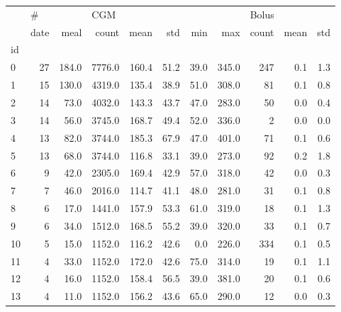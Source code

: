 \begin{tabular}{lrrrrrrrrrr}
\toprule
{} & \multicolumn{2}{l}{\#} & \multicolumn{5}{l}{CGM} & \multicolumn{3}{l}{Bolus} \\
{} & date &   meal &   count &   mean &   std &   min &    max & count & mean &  std \\
id &      &        &         &        &       &       &        &       &      &      \\
\midrule
0  &   27 &  184.0 &  7776.0 &  160.4 &  51.2 &  39.0 &  345.0 &   247 &  0.1 &  1.3 \\
1  &   15 &  130.0 &  4319.0 &  135.4 &  38.9 &  51.0 &  308.0 &    81 &  0.1 &  0.8 \\
2  &   14 &   73.0 &  4032.0 &  143.3 &  43.7 &  47.0 &  283.0 &    50 &  0.0 &  0.4 \\
3  &   14 &   56.0 &  3745.0 &  168.7 &  49.4 &  52.0 &  336.0 &     2 &  0.0 &  0.0 \\
4  &   13 &   82.0 &  3744.0 &  185.3 &  67.9 &  47.0 &  401.0 &    71 &  0.1 &  0.6 \\
5  &   13 &   68.0 &  3744.0 &  116.8 &  33.1 &  39.0 &  273.0 &    92 &  0.2 &  1.8 \\
6  &    9 &   42.0 &  2305.0 &  169.4 &  42.9 &  57.0 &  318.0 &    42 &  0.0 &  0.3 \\
7  &    7 &   46.0 &  2016.0 &  114.7 &  41.1 &  48.0 &  281.0 &    31 &  0.1 &  0.8 \\
8  &    6 &   17.0 &  1441.0 &  157.9 &  53.3 &  61.0 &  319.0 &    18 &  0.1 &  1.3 \\
9  &    6 &   34.0 &  1512.0 &  168.5 &  55.2 &  39.0 &  320.0 &    33 &  0.1 &  0.7 \\
10 &    5 &   15.0 &  1152.0 &  116.2 &  42.6 &   0.0 &  226.0 &   334 &  0.1 &  0.5 \\
11 &    4 &   33.0 &  1152.0 &  172.0 &  42.6 &  75.0 &  314.0 &    19 &  0.1 &  1.1 \\
12 &    4 &   16.0 &  1152.0 &  158.4 &  56.5 &  39.0 &  381.0 &    20 &  0.1 &  0.6 \\
13 &    4 &   11.0 &  1152.0 &  156.2 &  43.6 &  65.0 &  290.0 &    12 &  0.0 &  0.3 \\
\bottomrule
\end{tabular}
